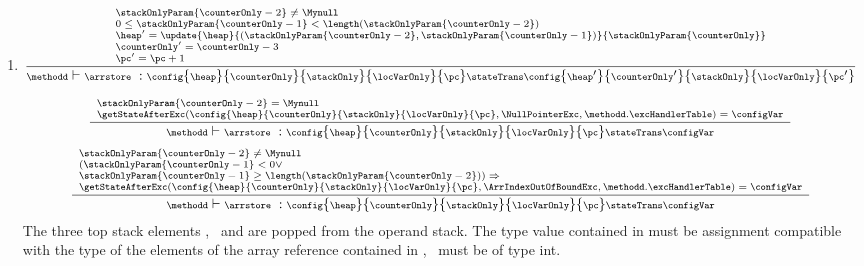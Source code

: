 \begin{itemize}
\begin{enumerate}
     
        \item \arrstore


      
	 $${\scriptsize \frac{ \begin{array}{l} 
	             \stackOnlyParam{\counterOnly - 2} \neq \Mynull  \\
		     0 \leq \stackOnlyParam{\counterOnly - 1  } < \length( \stackOnlyParam{\counterOnly - 2} )   \\
                     \heap' = \update{\heap}{( \stackOnlyParam{\counterOnly - 2},\stackOnlyParam{\counterOnly - 1} ) }{ \stackOnlyParam{\counterOnly}} \\
		     \counterOnly' = \counterOnly - 3 \\
		     \pc'  =  \pc + 1
		\end{array}}
		{\methodd \vdash  \arrstore \ :  \config{\heap}{\counterOnly}{\stackOnly}{\locVarOnly}{\pc} 
						 \stateTrans  
						 \config{\heap'}{\counterOnly'}{\stackOnly}{\locVarOnly}{\pc'}} } $$


       $${\scriptsize \frac{ \begin{array}{l}
	                      \stackOnlyParam{\counterOnly - 2} = \Mynull \\
			      \getStateAfterExc( \config{\heap}{\counterOnly}{\stackOnly}{\locVarOnly}{\pc} , \NullPointerExc,\methodd.\excHandlerTable ) =  \configVar  \\  
		   \end{array}}
		 {\methodd \vdash  \arrstore \ :  \config{\heap}{\counterOnly}{\stackOnly}{\locVarOnly}{\pc} 
			                         \stateTrans  
						 \configVar } } $$ 
        $${\scriptsize \frac{ \begin{array}{l} 
                                \stackOnlyParam{\counterOnly - 2} \neq \Mynull  \\
			  	( \stackOnlyParam{\counterOnly - 1} < 0 	\vee  \\
			       \stackOnlyParam{\counterOnly - 1} \geq \length (  \stackOnlyParam{\counterOnly - 2 }  ) ) \Rightarrow \\
			        \getStateAfterExc( \config{\heap}{\counterOnly}{\stackOnly}{\locVarOnly}{\pc}, \ArrIndexOutOfBoundExc ,\methodd.\excHandlerTable ) =  \configVar 
		    \end{array}}
		 {\methodd \vdash  \arrstore \ :  \config{\heap}{\counterOnly}{\stackOnly}{\locVarOnly}{\pc} 
			                         \stateTrans  
						 \configVar } } $$ 
	The three top stack elements \stackOnlyParam{\counterOnly},  \  and  
	are popped from the operand stack. The type value contained in \stackOnlyParam{\counterOnly} must be assignment 
	compatible with the type
	of the elements of the array reference contained in ,   \  must be of type int. 


\end{enumerate}
\end{itemize}
